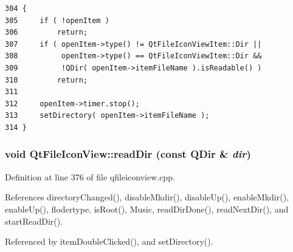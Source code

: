 \footnotesize\begin{verbatim}304 {
305     if ( !openItem )
306         return;
307     if ( openItem->type() != QtFileIconViewItem::Dir ||
308          openItem->type() == QtFileIconViewItem::Dir &&
309          !QDir( openItem->itemFileName ).isReadable() )
310         return;
311 
312     openItem->timer.stop();
313     setDirectory( openItem->itemFileName );
314 }
\end{verbatim}\normalsize 
{}
\subsubsection{\setlength{\rightskip}{0pt plus 5cm}void Qt\-File\-Icon\-View::read\-Dir (const QDir \& {\em dir})\hspace{0.3cm}{\tt  [protected]}}\label{classQtFileIconView_QtFileIconViewb0}




Definition at line 376 of file qfileiconview.cpp.

References directory\-Changed(), disable\-Mkdir(), disable\-Up(), enable\-Mkdir(), enable\-Up(), flodertype, is\-Root(), Music, read\-Dir\-Done(), read\-Next\-Dir(), and start\-Read\-Dir().

Referenced by item\-Double\-Clicked(), and set\-Directory().



